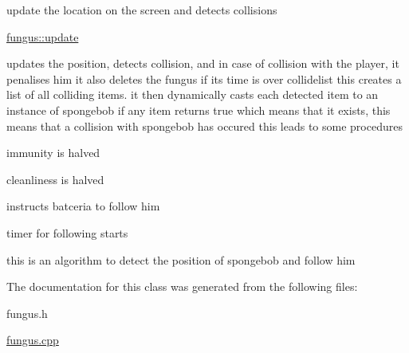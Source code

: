 update the location on the screen and detects collisions 

\hyperlink{classfungus_a2eb2952502ef6a467163a764f0cb773d}{fungus\-::update}

updates the position, detects collision, and in case of collision with the player, it penalises him it also deletes the fungus if its time is over collidelist this creates a list of all colliding items. it then dynamically casts each detected item to an instance of spongebob if any item returns true which means that it exists, this means that a collision with spongebob has occured this leads to some procedures

immunity is halved

cleanliness is halved

instructs batceria to follow him

timer for following starts

this is an algorithm to detect the position of spongebob and follow him 

The documentation for this class was generated from the following files\-:\begin{DoxyCompactItemize}
\item 
fungus.\-h\item 
\hyperlink{fungus_8cpp}{fungus.\-cpp}\end{DoxyCompactItemize}

